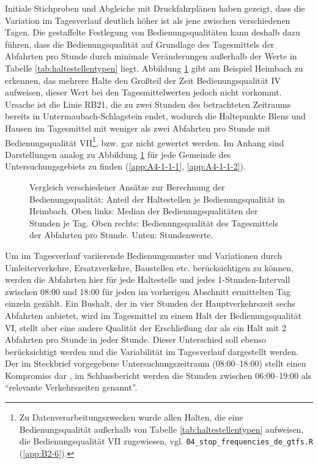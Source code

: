 \documentclass[11pt,pdftex,a4paper]{scrartcl}
\begin{document}
	Initiale Stichproben und Abgleiche mit Druckfahrplänen haben gezeigt, dass die Variation im Tagesverlauf deutlich höher ist als jene zwischen verschiedenen Tagen. Die gestaffelte Festlegung von Bedienungsqualitäten kann deshalb dazu führen, dass die Bedienungsqualität auf Grundlage des Tagesmittels der Abfahrten pro Stunde durch minimale Veränderungen außerhalb der Werte in Tabelle \ref{tab:haltestellentypen} liegt. Abbildung \ref{fig:HeimbachTagStunde} gibt am Beispiel Heimbach zu erkennen, das mehrere Halte den Großteil der Zeit Bedienungsqualität IV aufweisen, dieser Wert bei den Tagesmittelwerten jedoch nicht vorkommt. Ursache ist die Linie RB21, die zu zwei Stunden des betrachteten Zeitraums bereits in Untermaubach-Schlagstein endet, wodurch die Haltepunkte Blens und Hausen im Tagesmittel mit weniger als zwei Abfahrten pro Stunde mit Bedienungsqualität VII\footnote{Zu Datenverarbeitungszwecken wurde allen Halten, die eine Bedienungsqualität außerhalb von Tabelle \ref{tab:haltestellentypen} aufweisen, die Bedienungsqualität VII zugewiesen, vgl. \texttt{04\_stop\_frequencies\_de\_gtfs.R} (\ref{app:B2-6}).}, bzw. gar nicht gewertet werden. Im Anhang sind Darstellungen analog zu Abbildung \ref{fig:HeimbachTagStunde} für jede Gemeinde des Untersuchungsgebiets zu finden (\ref{app:A4-1-1-1}, \ref{app:A4-1-1-2}).

	\begin{figure}[!htb]
		\centering
		
		\caption[Vergleich verschiedener Ansätze zur Berechnung der Bedienungsqualität]{Vergleich verschiedener Ansätze zur Berechnung der Bedienungsqualität: Anteil der Haltestellen je Bedienungsqualität in Heimbach. Oben links: Median der Bedienungsqualitäten der Stunden je Tag. Oben rechts: Bedienungsqualität des Tagesmittels der Abfahrten pro Stunde. Unten: Stundenwerte.}
		\label{fig:HeimbachTagStunde}
	\end{figure}
		
	Um im Tagesverlauf variierende Bedienungsmuster und Variationen durch Umleiterverkehre, Ersatzverkehre, Baustellen etc. berücksichtigen zu können, werden die Abfahrten hier für jede Haltestelle und jedes 1-Stunden-Intervall zwischen 08:00 und 18:00 für jeden im vorherigen Abschnitt ermittelten Tag einzeln gezählt. Ein Bushalt, der in vier Stunden der Hauptverkehrszeit sechs Abfahrten anbietet, wird im Tagesmittel zu einem Halt der Bedienungsqualität VI, stellt aber eine andere Qualität der Erschließung dar als ein Halt mit 2 Abfahrten pro Stunde in jeder Stunde. Dieser Unterschied soll ebenso berücksichtigt werden und die Variabilität im Tagesverlauf dargestellt werden. Der im Steckbrief vorgegebene Untersuchungszeitraum (08:00--18:00) stellt einen Kompromiss dar \parencite[vgl.][85]{kcwgmbhMethodikUndEmpfehlungen2024}, im Schlussbericht werden die Stunden zwischen 06:00--19:00 als \enquote{relevante Verkehrszeiten genannt}.
\end{document}
